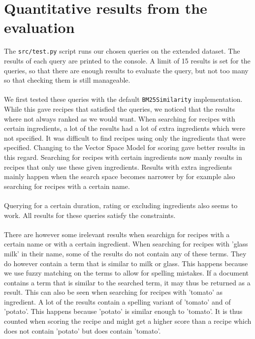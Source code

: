 \documentclass{article}
\begin{document}
\section{Quantitative results from the evaluation}

The \texttt{src/test.py} script runs our chosen queries on the extended dataset.
The results of each query are printed to the console.
A limit of 15 results is set for the queries,
so that there are enough results to evaluate the query,
but not too many so that checking them is still manageable.
\\~\\
We first tested these queries with the default \texttt{BM25Similarity} implementation.
While this gave recipes that satisfied the queries,
we noticed that the results where not always ranked as we would want.
When searching for recipes with certain ingredients,
a lot of the results had a lot of extra ingredients which were not specified.
It was difficult to find recipes using only the ingredients that were specified.
Changing to the Vector Space Model for scoring gave better results in this regard.
Searching for recipes with certain ingredients now manly results in recipes
that only use these given ingredients.
Results with extra ingredients mainly happen when the search space becomes
narrower by for example also searching for recipes with a certain name.
\\~\\
Querying for a certain duration, rating or excluding ingredients also seems to work.
All results for these queries satisfy the constraints.
\\~\\
There are however some irelevant results when searchign for recipes with
a certain name or with a certain ingredient.
When searching for recipes with 'glass milk' in their name,
some of the results do not contain any of these terms.
They do however contain a term that is similar to milk or glass.
This happens because we use fuzzy matching on the terms to allow for spelling mistakes.
If a document contains a term that is similar to the searched term,
it may thus be returned as a result.
This can also be seen when searching for recipes with 'tomato' as ingredient.
A lot of the results contain a spelling variant of 'tomato' and of 'potato'.
This happens because 'potato' is similar enough to 'tomato'.
It is thus counted when scoring the recipe and might get a higher score than
a recipe which does not contain 'potato' but does contain 'tomato'.
\end{document}
